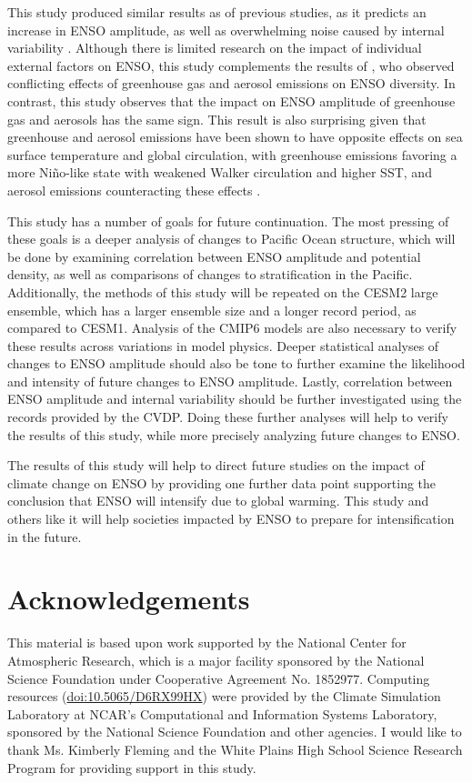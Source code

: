 \documentclass[12pt]{article}
\begin{document}
This study produced similar results as of previous studies, as it predicts an increase in ENSO amplitude, as well as overwhelming noise caused by internal variability \parencite{maher2018enso}. Although there is limited research on the impact of individual external factors on ENSO, this study complements the results of \cite{stevenson2019forced}, who observed conflicting effects of greenhouse gas and aerosol emissions on ENSO diversity. In contrast, this study observes that the impact on ENSO amplitude of greenhouse gas and aerosols has the same sign. This result is also surprising given that greenhouse and aerosol emissions have been shown to have opposite effects on sea surface temperature and global circulation, with greenhouse emissions favoring a more Niño-like state with weakened Walker circulation and higher SST, and aerosol emissions counteracting these effects \parencite{boer2000transient}.

This study has a number of goals for future continuation. The most pressing of these goals is a deeper analysis of changes to Pacific Ocean structure, which will be done by examining correlation between ENSO amplitude and potential density, as well as comparisons of changes to stratification in the Pacific. Additionally, the methods of this study will be repeated on the CESM2 large ensemble, which has a larger ensemble size and a longer record period, as compared to CESM1. Analysis of the CMIP6 models are also necessary to verify these results across variations in model physics. Deeper statistical analyses of changes to ENSO amplitude should also be tone to further examine the likelihood and intensity of future changes to ENSO amplitude. Lastly, correlation between ENSO amplitude and internal variability should be further investigated using the records provided by the CVDP. Doing these further analyses will help to verify the results of this study, while more precisely analyzing future changes to ENSO.

The results of this study will help to direct future studies on the impact of climate change on ENSO by providing one further data point supporting the conclusion that ENSO will intensify due to global warming. This study and others like it will help societies impacted by ENSO to prepare for intensification in the future.

\section{Acknowledgements}
This material is based upon work supported by the National Center for Atmospheric Research, which is a major facility sponsored by the National Science Foundation under Cooperative Agreement No. 1852977. Computing resources (\href{https://doi.org/10.5065/D6RX99HX}{doi:10.5065/D6RX99HX}) were provided by the Climate Simulation Laboratory at NCAR's Computational and Information Systems Laboratory, sponsored by the National Science Foundation and other agencies. I would like to thank Ms. Kimberly Fleming and the White Plains High School Science Research Program for providing support in this study.

\printbibliography
\end{document}
